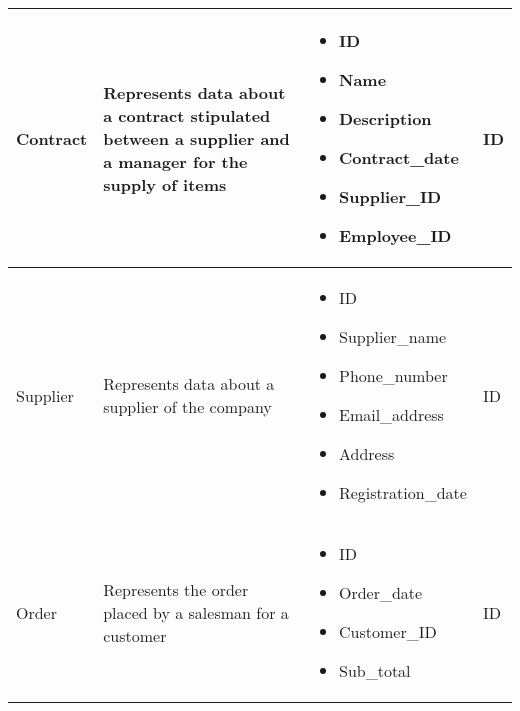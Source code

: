\begin{longtable}{|p{}|p{} |p{}|p{} |}
    Contract & Represents data about a contract stipulated between a supplier and a manager for the supply of items &
    \begin{itemize}
        \vspace{-1em}
        \item ID
        \item Name
        \item Description
        \item Contract\_date
        \item Supplier\_ID
        \item Employee\_ID
    \end{itemize}
    &  ID \\\hline

    Supplier & Represents data about a supplier of the company &
    \begin{itemize}
        \vspace{-1em}
        \item ID
        \item Supplier\_name
        \item Phone\_number
        \item Email\_address
        \item Address
        \item Registration\_date
    \end{itemize}
    &  ID \\\hline

    Order & Represents the order placed by a salesman for a customer &
    \begin{itemize}
        \vspace{-1em}
        \item ID
        \item Order\_date
        \item Customer\_ID
        \item Sub\_total            %
    \end{itemize}
    &  ID \\\hline



\end{longtable}
